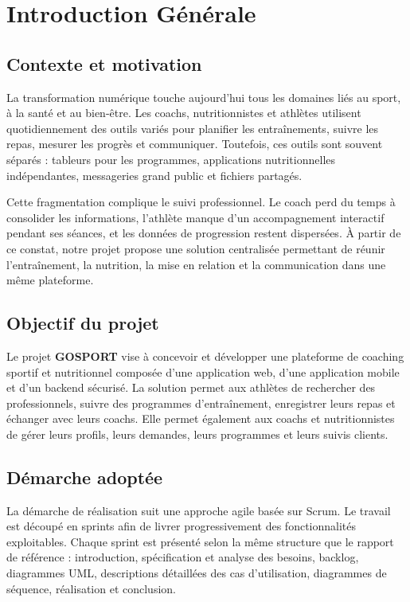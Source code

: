 \chapter*{Introduction Générale}
\minitoc
\mtcaddchapter

\section*{Contexte et motivation}
\mtcaddsection
La transformation numérique touche aujourd'hui tous les domaines liés au sport, à la santé et au bien-être. Les coachs, nutritionnistes et athlètes utilisent quotidiennement des outils variés pour planifier les entraînements, suivre les repas, mesurer les progrès et communiquer. Toutefois, ces outils sont souvent séparés : tableurs pour les programmes, applications nutritionnelles indépendantes, messageries grand public et fichiers partagés.

Cette fragmentation complique le suivi professionnel. Le coach perd du temps à consolider les informations, l'athlète manque d'un accompagnement interactif pendant ses séances, et les données de progression restent dispersées. À partir de ce constat, notre projet propose une solution centralisée permettant de réunir l'entraînement, la nutrition, la mise en relation et la communication dans une même plateforme.

\section*{Objectif du projet}
\mtcaddsection
Le projet \textbf{GOSPORT} vise à concevoir et développer une plateforme de coaching sportif et nutritionnel composée d'une application web, d'une application mobile et d'un backend sécurisé. La solution permet aux athlètes de rechercher des professionnels, suivre des programmes d'entraînement, enregistrer leurs repas et échanger avec leurs coachs. Elle permet également aux coachs et nutritionnistes de gérer leurs profils, leurs demandes, leurs programmes et leurs suivis clients.

\section*{Démarche adoptée}
\mtcaddsection
La démarche de réalisation suit une approche agile basée sur Scrum. Le travail est découpé en sprints afin de livrer progressivement des fonctionnalités exploitables. Chaque sprint est présenté selon la même structure que le rapport de référence : introduction, spécification et analyse des besoins, backlog, diagrammes UML, descriptions détaillées des cas d'utilisation, diagrammes de séquence, réalisation et conclusion.

